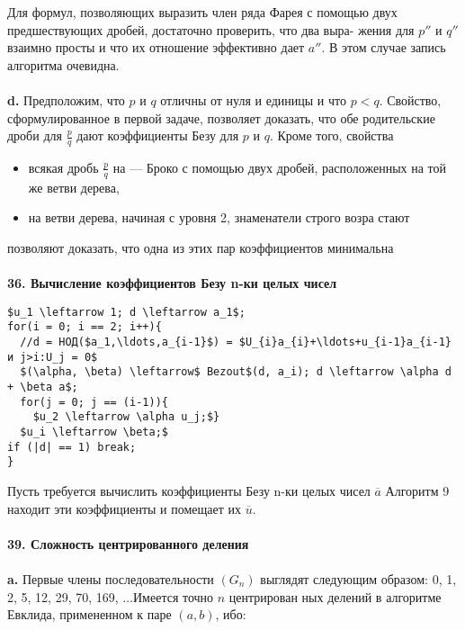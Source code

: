 Для формул, позволяющих выразить член ряда Фарея с помощью\linebreak
двух предшествующих дробей, достаточно проверить, что два выра-\linebreak
жения для $p''$ и $q''$  взаимно просты и что их отношение эффективно\linebreak
дает $a''$. В этом случае запись алгоритма очевидна.\\
\\
\hspace*{15pt}\textbf{d.} Предположим, что $p$ и $q$ отличны от нуля и единицы и что $p < q$.\linebreak
Свойство, сформулированное в первой задаче, позволяет доказать, что
обе родительские дроби для $\frac{p}{q}$ дают коэффициенты Безу для $p$ и $q$.
Кроме того, свойства
		\begin{itemize}
				\item всякая дробь $\frac{p}{q}$ на — Броко с помощью\linebreak
двух дробей, расположенных на той же ветви дерева,
				\item на ветви дерева, начиная с уровня 2, знаменатели строго возра­\linebreak
стают
\end{itemize}
позволяют доказать, что одна из этих пар коэффициентов минимальна\\
\\
\noindent\textbf{36. Вычисление коэффициентов Безу n-ки целых чисел}\\
\begin{lstlisting}[mathescape = true, caption = {Коэффициенты Безу}]
$u_1 \leftarrow 1; d \leftarrow a_1$;
for(i = 0; i == 2; i++){
  //d = НОД($a_1,\ldots,a_{i-1}$) = $U_{i}a_{i}+\ldots+u_{i-1}a_{i-1} и j>i:U_j = 0$
  $(\alpha, \beta) \leftarrow$ Bezout$(d, a_i); d \leftarrow \alpha d + \beta a$;
  for(j = 0; j == (i-1)){
    $u_2 \leftarrow \alpha u_j;$}
  $u_i \leftarrow \beta;$
if (|d| == 1) break;
}
\end{lstlisting}
\newpage
Пусть требуется вычислить коэффициенты Безу n-ки целых чисел $\overline{a}$\linebreak
Алгоритм 9 находит эти коэффициенты и помещает их $\overline{u}$.\\
\\
\noindent\textbf{39. Сложность центрированного деления}\\
\\
\hspace*{15pt}\textbf{a.} Первые члены последовательности $(G_n)$ выглядят следующим\linebreak
образом: 0, 1, 2, 5, 12, 29, 70, 169, ...Имеется точно $n$ центрирован­\linebreak
ных делений в алгоритме Евклида, примененном к паре $(a, b)$, ибо:


